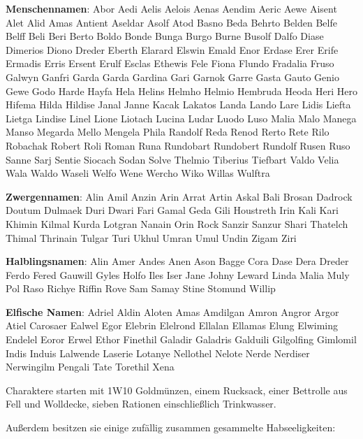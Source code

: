 \documentclass[11pt]{wbzine}
\begin{document}
\begin{multicols}{2}
\textbf{Menschennamen}:
Abor
Aedi
Aelis
Aelois
Aenas
Aendim
Aeric
Aewe
Aisent
Alet
Alid
Amas
Antient
Aseldar
Asolf
Atod
Basno
Beda
Behrto
Belden
Belfe
Belff
Beli
Beri
Berto
Boldo
Bonde
Bunga
Burgo
Burne
Busolf
Dalfo
Diase
Dimerios
Diono
Dreder
Eberth
Elarard
Elswin
Emald
Enor
Erdase
Erer
Erife
Ermadis
Erris
Ersent
Erulf
Esclas
Ethewis
Fele
Fiona
Flundo
Fradalia
Fruso
Galwyn
Ganfri
Garda
Garda
Gardina
Gari
Garnok
Garre
Gasta
Gauto
Genio
Gewe
Godo
Harde
Hayfa
Hela
Helins
Helmho
Helmio
Hembruda
Heoda
Heri
Hero
Hifema
Hilda
Hildise
Janal
Janne
Kacak
Lakatos
Landa
Lando
Lare
Lidis
Liefta
Lietga
Lindise
Linel
Lione
Liotach
Lucina
Ludar
Luodo
Luso
Malia
Malo
Manega
Manso
Megarda
Mello
Mengela
Phila
Randolf
Reda
Renod
Rerto
Rete
Rilo
Robachak
Robert
Roli
Roman
Runa
Rundobart
Rundobert
Rundolf
Rusen
Ruso
Sanne
Sarj
Sentie
Siocach
Sodan
Solve
Thelmio
Tiberius
Tiefbart
Valdo
Velia
Wala
Waldo
Waseli
Welfo
Wene
Wercho
Wiko
Willas
Wulftra

\textbf{Zwergennamen}:
Alin
Amil
Anzin
Arin
Arrat
Artin
Askal
Bali
Brosan
Dadrock
Doutum
Dulmaek
Duri
Dwari
Fari
Gamal
Geda
Gili
Houstreth
Irin
Kali
Kari
Khimin
Kilmal
Kurda
Lotgran
Nanain
Orin
Rock
Sanzir
Sanzur
Shari
Thatelch
Thimal
Thrinain
Tulgar
Turi
Ukhul
Umran
Umul
Undin
Zigam
Ziri

\textbf{Halblingsnamen}:
Alin
Amer
Andes
Anen
Ason
Bagge
Cora
Dase
Dera
Dreder
Ferdo
Fered
Gauwill
Gyles
Holfo
Iles
Iser
Jane
Johny
Leward
Linda
Malia
Muly
Pol
Raso
Richye
Riffin
Rove
Sam
Samay
Stine
Stomund
Willip

\textbf{Elfische Namen}:
Adriel
Aldin
Aloten
Amas
Amdilgan
Amron
Angror
Argor
Atiel
Carosaer
Ealwel
Egor
Elebrin
Elelrond
Ellalan
Ellamas
Elung
Elwiming
Endelel
Eoror
Erwel
Ethor
Finethil
Galadir
Galadris
Galduili
Gilgolfing
Gimlomil
Indis
Induis
Lalwende
Laserie
Lotanye
Nellothel
Nelote
Nerde
Nerdiser
Nerwingilm
Pengali
Tate
Torethil
Xena

\begin{tcolorbox}
Charaktere starten mit 1W10 Goldmünzen, einem Rucksack, einer
Bettrolle aus Fell und Wolldecke, sieben Rationen einschließlich
Trinkwasser.
\end{tcolorbox}

Außerdem besitzen sie einige zufällig zusammen gesammelte
Habseeligkeiten:

\end{multicols}
\end{document}
